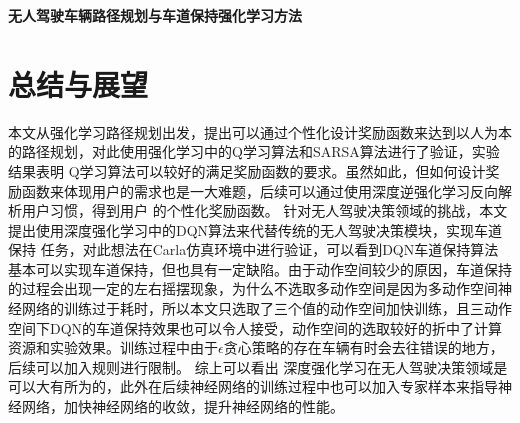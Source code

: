 \documentclass[zihao=-4,a4paper]{ctexart}
\begin{document}
	\newpage
	\thispagestyle{plain}
	\renewcommand\contentsname{\centerline{\zihao{3}    目\hspace*{2em}录}}

	\tableofcontents
	\thispagestyle{plain}
% 
	
	\newpage
	
	\thispagestyle{fancy}
	\vspace*{-20pt}
	\begin{center}
	 \bfseries  无人驾驶车辆路径规划与车道保持强化学习方法
	\vspace*{20pt}
	\end{center}
	
	
 \sectionend
 \sectionend
 \sectionend
 \sectionend


	
	\vspace*{0pt}
	\section*{总结与展望}	
	
	
  
  本文从强化学习路径规划出发，提出可以通过个性化设计奖励函数来达到以人为本的路径规划，对此使用强化学习中的Q学习算法和SARSA算法进行了验证，实验结果表明
Q学习算法可以较好的满足奖励函数的要求。虽然如此，但如何设计奖励函数来体现用户的需求也是一大难题，后续可以通过使用深度逆强化学习反向解析用户习惯，得到用户
的个性化奖励函数。
针对无人驾驶决策领域的挑战，本文提出使用深度强化学习中的DQN算法来代替传统的无人驾驶决策模块，实现车道保持
任务，对此想法在Carla仿真环境中进行验证，可以看到DQN车道保持算法基本可以实现车道保持，但也具有一定缺陷。由于动作空间较少的原因，车道保持的过程会出现一定的左右摇摆现象，为什么不选取多动作空间是因为多动作空间神经网络的训练过于耗时，所以本文只选取了三个值的动作空间加快训练，且三动作空间下DQN的车道保持效果也可以令人接受，动作空间的选取较好的折中了计算资源和实验效果。训练过程中由于$\epsilon$贪心策略的存在车辆有时会去往错误的地方，后续可以加入规则进行限制。
综上可以看出
深度强化学习在无人驾驶决策领域是可以大有所为的，此外在后续神经网络的训练过程中也可以加入专家样本来指导神经网络，加快神经网络的收敛，提升神经网络的性能。
   
\end{document}
